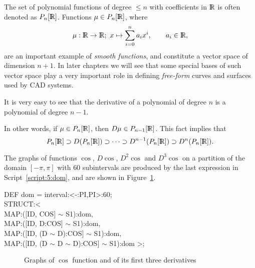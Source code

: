 \documentclass{31x47jw}
\begin{document}
\begin{example}[Polynomials]

The set of polynomial functions of degree $\leq n$ with coefficients
in $\mathbb{I\!\!R}$ is often denoted as $P_{n}[\mathbb{I\!\!R}]$.  Functions $\mu\in
P_{n}[\mathbb{I\!\!R}]$, where
\[
\mu: \mathbb{I\!\!R}\rightarrow\mathbb{I\!\!R} ;\ x\mapsto\sum_{i=0}^{n}a_{i}x^{i}, \qquad 
a_{i}\in\mathbb{I\!\!R},
\]
are an important example of \emph{smooth functions}, and constitute a
vector space of dimension $n+1$.  In later chapters we will see that
some special bases of such vector space play a very important role in
defining \emph{free-form} curves and surfaces used by CAD systems.

It is very easy to see that the derivative of a polynomial of degree
$n$ is a polynomial of degree $n-1$.  

In other words, if $\mu\in P_{n}[\mathbb{I\!\!R}]$, then $D\mu\in P_{n-1}[\mathbb{I\!\!R}]$. 
This fact implies that
\[
P_{n}[\R] \supset D(P_{n}[\R]) \supset \cdots \supset 
D^{n-1}(P_{n}[\R]) \supset D^{n}(P_{n}[\R]).
\]


\end{example}

\begin{example}
    
The graphs of functions $\cos$, $D\cos$, $D^{2}\cos$ and $D^{3}\cos$
on a partition of the domain $[-\pi, \pi]$ with $60$ subintervals are
produced by the last expression in Script~\ref{script:5:dom}, and are
shown in Figure~\ref{figure:5:ex6}.
    
\begin{script}
\begin{smallplasm}
DEF dom = interval:<-:PI,PI>:60;\\[0.3cm]

STRUCT:<\+\\
  MAP:([ID, COS] $\sim$ S1):dom,\\
  MAP:([ID, D:COS] $\sim$ S1):dom,\\
  MAP:([ID, (D $\sim$ D):COS] $\sim$ S1):dom,\\
  MAP:([ID, (D $\sim$ D $\sim$ D):COS] $\sim$ S1):dom >;
\end{smallplasm}
\label{script:5:dom}
\end{script}


\begin{figure}[htb]
\centering{}
\caption{Graphs of $\cos$ function and of its first three derivatives
\label{figure:5:ex6}}
\end{figure}

\end{example}
\end{document}
